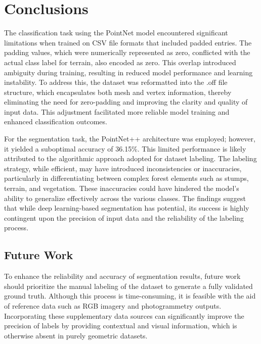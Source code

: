 \documentclass[../report.tex]{subfiles}
\begin{document}
    \section{Conclusions}
    \label{sec:conclusions}
    The classification task using the PointNet model encountered significant limitations when trained on CSV file formats that included padded entries. The padding values, which were numerically represented as zero, conflicted with the actual class label for terrain, also encoded as zero. This overlap introduced ambiguity during training, resulting in reduced model performance and learning instability. To address this, the dataset was reformatted into the .off file structure, which encapsulates both mesh and vertex information, thereby eliminating the need for zero-padding and improving the clarity and quality of input data. This adjustment facilitated more reliable model training and enhanced classification outcomes.

    For the segmentation task, the PointNet++ architecture was employed; however, it yielded a suboptimal accuracy of 36.15\%. This limited performance is likely attributed to the algorithmic approach adopted for dataset labeling. The labeling strategy, while efficient, may have introduced inconsistencies or inaccuracies, particularly in differentiating between complex forest elements such as stumps, terrain, and vegetation. These inaccuracies could have hindered the model’s ability to generalize effectively across the various classes. The findings suggest that while deep learning-based segmentation has potential, its success is highly contingent upon the precision of input data and the reliability of the labeling process.



    \subsection{Future Work}
    \label{sec:conclusions:future_work}
    To enhance the reliability and accuracy of segmentation results, future work should prioritize the manual labeling of the dataset to generate a fully validated ground truth. Although this process is time-consuming, it is feasible with the aid of reference data such as RGB imagery and photogrammetry outputs. Incorporating these supplementary data sources can significantly improve the precision of labels by providing contextual and visual information, which is otherwise absent in purely geometric datasets.
\end{document}
